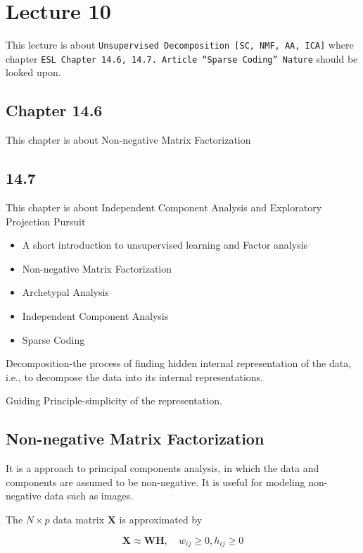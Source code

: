 \chapter{Lecture 10}

This lecture is about \texttt{Unsupervised Decomposition
[SC, NMF, AA, ICA]} where chapter \texttt{ESL Chapter 14.6, 14.7.
Article “Sparse Coding”
Nature} should be looked upon.

\section{Chapter 14.6}

This chapter is about Non-negative Matrix Factorization

\section{14.7}

This chapter is about Independent Component Analysis and
Exploratory Projection Pursuit

\begin{itemize}
  \item A short introduction to unsupervised learning and Factor analysis
  \item Non-negative Matrix Factorization
  \item Archetypal Analysis
  \item Independent Component Analysis
  \item Sparse Coding
\end{itemize}

Decomposition-the process of finding hidden internal representation of the data, i.e., to decompose the data into its internal representations.

Guiding Principle-simplicity of the representation.

\section{Non-negative Matrix Factorization}

It is a approach to principal components analysis, in which the data
and components are assumed to be non-negative. It is useful for modeling
non-negative data such as images.

The $N \times p$ data matrix $\bm{X}$ is approximated by

\[
    \bm{X} \approx \bm{W} \bm{H}, \quad w_{ij} \geq 0, h_{ij} \geq 0
\]

